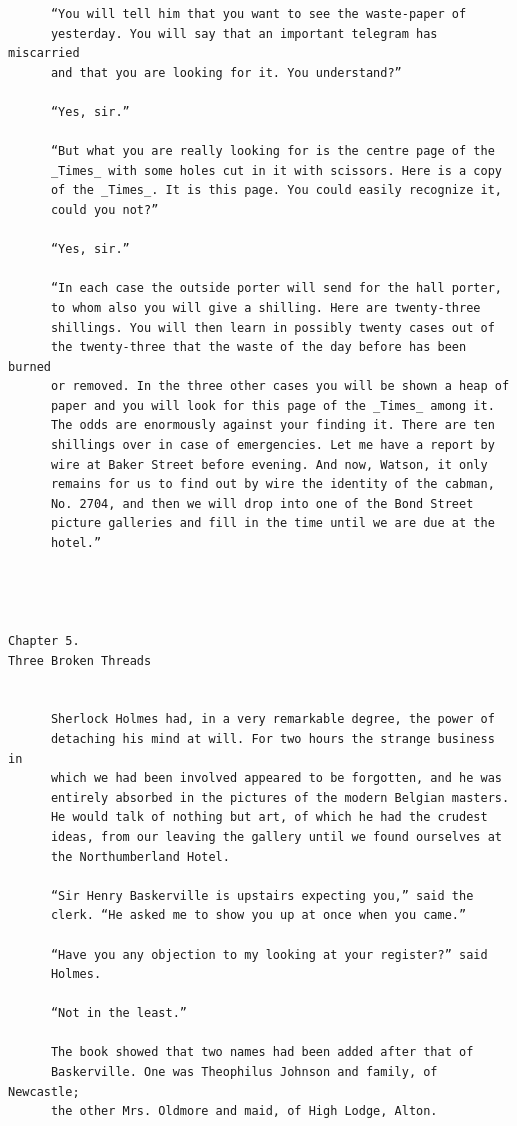 \documentclass{article}
\begin{document}
\begin{verbatim}
      “You will tell him that you want to see the waste-paper of
      yesterday. You will say that an important telegram has miscarried
      and that you are looking for it. You understand?”

      “Yes, sir.”

      “But what you are really looking for is the centre page of the
      _Times_ with some holes cut in it with scissors. Here is a copy
      of the _Times_. It is this page. You could easily recognize it,
      could you not?”

      “Yes, sir.”

      “In each case the outside porter will send for the hall porter,
      to whom also you will give a shilling. Here are twenty-three
      shillings. You will then learn in possibly twenty cases out of
      the twenty-three that the waste of the day before has been burned
      or removed. In the three other cases you will be shown a heap of
      paper and you will look for this page of the _Times_ among it.
      The odds are enormously against your finding it. There are ten
      shillings over in case of emergencies. Let me have a report by
      wire at Baker Street before evening. And now, Watson, it only
      remains for us to find out by wire the identity of the cabman,
      No. 2704, and then we will drop into one of the Bond Street
      picture galleries and fill in the time until we are due at the
      hotel.”




Chapter 5.
Three Broken Threads


      Sherlock Holmes had, in a very remarkable degree, the power of
      detaching his mind at will. For two hours the strange business in
      which we had been involved appeared to be forgotten, and he was
      entirely absorbed in the pictures of the modern Belgian masters.
      He would talk of nothing but art, of which he had the crudest
      ideas, from our leaving the gallery until we found ourselves at
      the Northumberland Hotel.

      “Sir Henry Baskerville is upstairs expecting you,” said the
      clerk. “He asked me to show you up at once when you came.”

      “Have you any objection to my looking at your register?” said
      Holmes.

      “Not in the least.”

      The book showed that two names had been added after that of
      Baskerville. One was Theophilus Johnson and family, of Newcastle;
      the other Mrs. Oldmore and maid, of High Lodge, Alton.


\end{verbatim}
\end{document}
